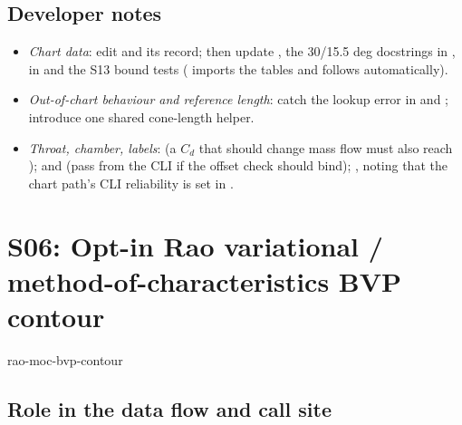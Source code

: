 \subsection{Developer notes}

\begin{itemize}
  \item \emph{Chart data}: edit  and its  record; then update
  , the 30/15.5 deg docstrings in ,
   in  and the S13 bound tests
  ( imports the tables and follows automatically).
  \item \emph{Out-of-chart behaviour and reference length}: catch the lookup error in 
  and ; introduce one shared cone-length helper.
  \item \emph{Throat, chamber, labels}:  (a $C_d$ that should change mass flow must also
  reach );  and
   (pass  from the CLI if the offset check should
  bind); , noting that the chart path's CLI reliability is set in .
\end{itemize}

\section{S06: Opt-in Rao variational / method-of-characteristics BVP contour}\label{sec:s06}
 \quad rao-moc-bvp-contour

\subsection{Role in the data flow and call site}

